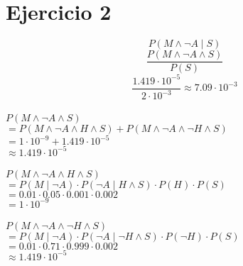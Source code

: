 \documentclass {article}
\begin{document}
\clearpage
\section {Ejercicio 2}
$$P (M \land \neg A \mid S)$$
$$\frac
	{P (M \land \neg A \land S)}
	{P (S)}$$
$$\frac
	{1.419 \cdot 10^{-5}}
	{2 \cdot 10^{-3}} \approx 7.09 \cdot 10^{-3}$$
\\
$P(M \land \neg A \land S)$\\
	\indent $ 
		= P(M \land \neg A \land H \land S) 
		+ P(M \land \neg A \land \neg H \land S)$\\
	\indent $ 
		= 1 \cdot 10^{-9} 
		+ 1.419 \cdot 10^{-5}$\\
	\indent $ 
		\approx 1.419 \cdot 10^{-5} $\\
\\
$P(M \land \neg A \land H \land S)$\\
	\indent $ 
		= P(M \mid \neg A) 
		\cdot P(\neg A \mid H \land S) 
		\cdot P (H) 
		\cdot P (S)$\\
	\indent $ 
		= 0.01 
		\cdot 0.05 
		\cdot 0.001 
		\cdot 0.002$\\
	\indent $ =
		 1 \cdot 10^{-9}$\\
\\
$P(M \land \neg A \land \neg H \land S)$\\
	\indent $ 
		= P(M \mid \neg A) 
		\cdot P(\neg A \mid \neg H \land S) 
		\cdot P (\neg H) 
		\cdot P (S)$\\
	\indent $ 
		= 0.01 
		\cdot 0.71 
		\cdot 0.999 
		\cdot 0.002$\\
	\indent $ 
		\approx 1.419 \cdot 10^{-5}$\\


\clearpage
\end{document}
